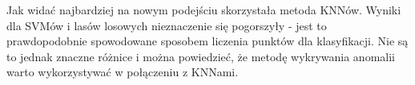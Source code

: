 \documentclass[a4paper]{report}
\begin{document}
Jak widać najbardziej na nowym podejściu skorzystała metoda KNNów. Wyniki dla SVMów i lasów losowych nieznaczenie się pogorszyły - jest to prawdopodobnie spowodowane sposobem liczenia punktów dla klasyfikacji. Nie są to jednak znaczne różnice i można powiedzieć, że metodę wykrywania anomalii warto wykorzystywać w połączeniu z KNNami.
\end{document}

